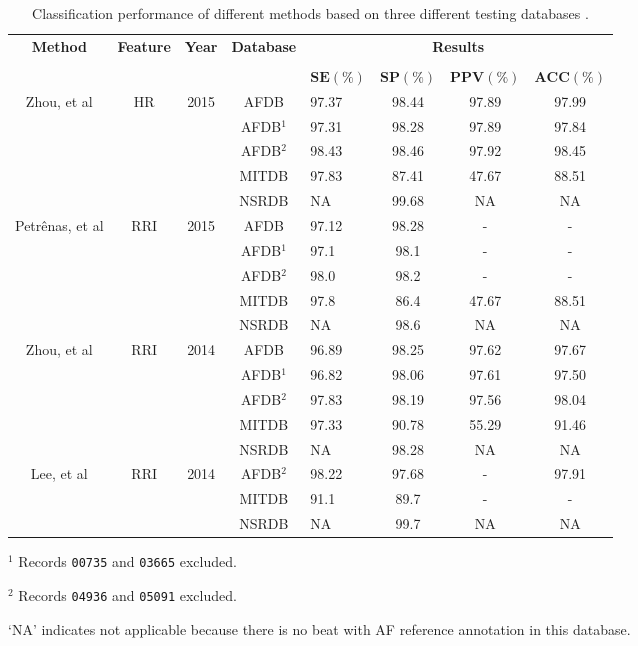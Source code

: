 \begin{table}[h]
\begin{threeparttable}
\caption[Performance comparison of some state of the art methods.]{Classification performance of different methods based on three different testing databases \cite[p. 8]{zhou2015}.}
\label{table:zhou_hr_rri}
\scriptsize
  \begin{tabularx}{\linewidth}{c c c c X c c c}
  \toprule
  \textbf{Method} & \textbf{Feature} & \textbf{Year} & \textbf{Database} & \multicolumn{4}{c}{\textbf{Results}} \\
  \cline{5-8}
  \\
  & & & & $\mathbf{SE(\%)}$ & $\mathbf{SP(\%)}$ & $\mathbf{PPV(\%)}$ & $\mathbf{ACC(\%)}$\\
  \midrule  
  Zhou, et al\cite{zhou2015} & HR & 2015 & AFDB & 97.37 & 98.44 & 97.89 & 97.99\\
  & & & AFDB$^1$ & 97.31 & 98.28 & 97.89 & 97.84 \\
  & & & AFDB$^2$ & 98.43 & 98.46 & 97.92 & 98.45 \\
  & & & MITDB & 97.83 & 87.41 & 47.67 & 88.51 \\
  & & & NSRDB & NA & 99.68 & NA & NA \\
  \hline
  Petrênas, et al\cite{petrenas2015} & RRI & 2015 & AFDB & 97.12 & 98.28 & - & -\\
  & & & AFDB$^1$ & 97.1 & 98.1 & - & - \\
  & & & AFDB$^2$ & 98.0 & 98.2 & - & - \\
  & & & MITDB & 97.8 & 86.4 & 47.67 & 88.51 \\
  & & & NSRDB & NA & 98.6 & NA & NA \\
  \hline
  Zhou, et al\cite{zhou2014} & RRI & 2014 & AFDB & 96.89 & 98.25 & 97.62 & 97.67\\
  & & & AFDB$^1$ & 96.82 & 98.06 & 97.61 & 97.50 \\
  & & & AFDB$^2$ & 97.83 & 98.19 & 97.56 & 98.04 \\
  & & & MITDB & 97.33 & 90.78 & 55.29 & 91.46 \\
  & & & NSRDB & NA & 98.28 & NA & NA \\
  \hline
  Lee, et al\cite{lee2013} & RRI & 2014 & AFDB$^2$ & 98.22 & 97.68 & - & 97.91\\
  & & & MITDB & 91.1 & 89.7 & - & - \\
  & & & NSRDB & NA & 99.7 & NA & NA \\
  \bottomrule
\end{tabularx}
\begin{tablenotes}
 	\item $^1$ Records \verb|00735| and \verb|03665| excluded.
	\item $^2$ Records \verb|04936| and \verb|05091| excluded.
	\item ‘NA’ indicates not applicable because there is no beat with AF reference annotation in this database.
    \end{tablenotes}
\end{threeparttable}
\end{table}
